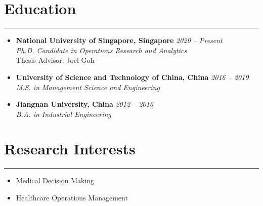 \documentclass[12pt, a4paper]{article}
\begin{document}
{\small

\section*{Education}
\vspace*{0.4em}
\hrule height 0.4pt
\begin{itemize}[leftmargin=20pt, itemsep=6pt, parsep=0.2pt, topsep=1pt]

	\item[]
	\textbf{National University of Singapore, Singapore} \hfill \textit{2020 -- Present} \\
	\textit{Ph.D. Candidate in Operations Research and Analytics} \\
	Thesis Advisor: Joel Goh

	\item[]
	\textbf{University of Science and Technology of China, China} \hfill \textit{2016 -- 2019} \\
	\textit{M.S. in Management Science and Engineering}

	\item[]
	\textbf{Jiangnan University, China} \hfill \textit{2012 -- 2016} \\
	\textit{B.A. in Industrial Engineering}

\end{itemize}




\section*{Research Interests}
\vspace*{0.4em}
\hrule height 0.5pt
\begin{itemize}[leftmargin=36pt, itemsep=6pt, parsep=0.2pt, topsep=1pt]

	\item Medical Decision Making
	
	\item Healthcare Operations Management
	

\end{itemize}}
\end{document}
